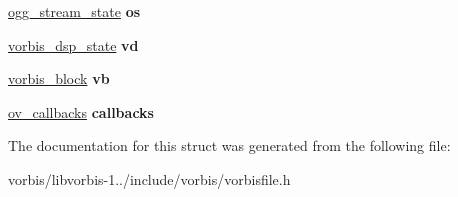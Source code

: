 \begin{DoxyCompactItemize}
\item 
\hypertarget{struct_ogg_vorbis___file_a8658f17a6f662a74f8763c47d560d712}{\hyperlink{structogg__stream__state}{ogg\+\_\+stream\+\_\+state} {\bfseries os}}\label{struct_ogg_vorbis___file_a8658f17a6f662a74f8763c47d560d712}

\item 
\hypertarget{struct_ogg_vorbis___file_acb9d38719f54642d1a39f24203b466d6}{\hyperlink{structvorbis__dsp__state}{vorbis\+\_\+dsp\+\_\+state} {\bfseries vd}}\label{struct_ogg_vorbis___file_acb9d38719f54642d1a39f24203b466d6}

\item 
\hypertarget{struct_ogg_vorbis___file_a3201599977a781b7bf559167cd892638}{\hyperlink{structvorbis__block}{vorbis\+\_\+block} {\bfseries vb}}\label{struct_ogg_vorbis___file_a3201599977a781b7bf559167cd892638}

\item 
\hypertarget{struct_ogg_vorbis___file_afb1474e24193f577dd21395a76199415}{\hyperlink{structov__callbacks}{ov\+\_\+callbacks} {\bfseries callbacks}}\label{struct_ogg_vorbis___file_afb1474e24193f577dd21395a76199415}

\end{DoxyCompactItemize}


The documentation for this struct was generated from the following file\+:\begin{DoxyCompactItemize}
\item 
vorbis/libvorbis-\/1../include/vorbis/vorbisfile.\+h\end{DoxyCompactItemize}
